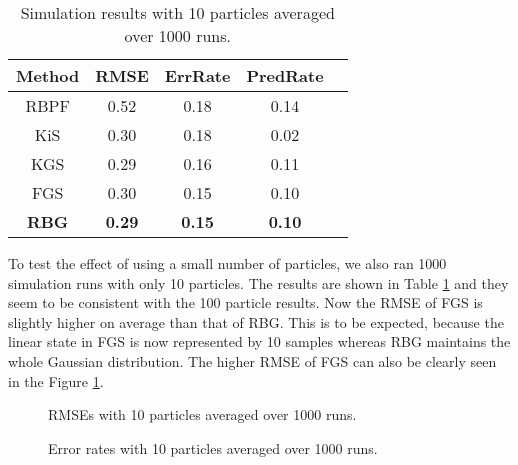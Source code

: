 \documentclass[twocolumn]{autart}    %
\begin{document}
%
\begin{table}[htb]
\begin{center}
\begin{tabular}{|c|c|c|c|c|}
\hline
Method & RMSE              & ErrRate       &   PredRate \\
\hline
\hline
RBPF   & 0.52 & 0.18 & 0.14 \\ \hline
KiS    & 0.30 & 0.18 & 0.02 \\ \hline
KGS    & 0.29 & 0.16 & 0.11 \\ \hline
FGS    & 0.30 & 0.15 & 0.10 \\ \hline
{\bf RBG} & {\bf 0.29} & {\bf 0.15} & {\bf 0.10} \\ \hline
\end{tabular}
\end{center}
\caption{Simulation results with 10 particles averaged over 1000 runs. }
\label{tbl:res10}
\end{table}

To test the effect of using a small number of particles, we also ran
1000 simulation runs with only 10 particles. The results are shown in
Table \ref{tbl:res10} and they seem to be consistent with the 100
particle results. Now the RMSE of FGS is slightly higher on average
than that of RBG. This is to be expected, because the linear state in
FGS is now represented by 10 samples whereas RBG maintains the whole
Gaussian distribution. The higher RMSE of FGS can also be clearly seen
in the Figure \ref{fig:10_rmse}.

\begin{figure}[htb]
\begin{center}
\end{center}
\caption{RMSEs with 10 particles averaged over 1000 runs.}
\label{fig:10_rmse}
\end{figure}

\begin{figure}[htb]
\begin{center}
\end{center}
\caption{Error rates with 10 particles averaged over 1000 runs.}
\label{fig:10_err}
\end{figure}
\end{document}
